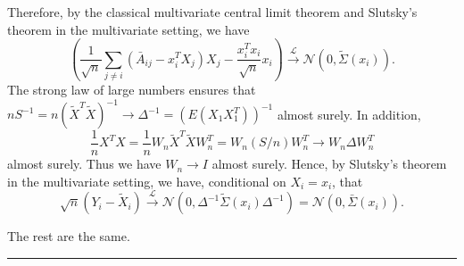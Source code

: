 \documentclass[a4paper]{article}
\newenvironment{proof}{{\bf Proof:  }}{\hfill\rule{2mm}{2mm}}
\begin{document}
\begin{proof}
Therefore, by the classical multivariate central limit theorem and Slutsky's theorem in the multivariate setting, we have
\[
	\left( \frac{1}{\sqrt{n}} \sum_{j \ne i}(\bar{A}_{ij} - x_i^T X_j) X_j - \frac{x_i^T x_i}{\sqrt{n}} x_i \right) \stackrel{\mathcal{L}}{\rightarrow} \mathcal{N}(0, \tilde{\Sigma}(x_i)).
\]
The strong law of large numbers ensures that $n S^{-1} = n (\tilde{X}^T \tilde{X})^{-1} \rightarrow \Delta^{-1} = (E(X_1 X_1^T))^{-1}$ almost surely. In addition,
\[
	\frac{1}{n} X^T X =  \frac{1}{n} W_n \tilde{X}^T \tilde{X} W_n^T = W_n (S/n) W_n^T \rightarrow W_n \Delta W_n^T
\]
almost surely. Thus we have $W_n \rightarrow I$ almost surely. Hence, by Slutsky's theorem in the multivariate setting, we have, conditional on $X_i = x_i$, that
\[
	\sqrt{n}(Y_i - \tilde{X}_i) \stackrel{\mathcal{L}}{\rightarrow} \mathcal{N}(0, \Delta^{-1} \tilde{\Sigma}(x_i) \Delta^{-1}) = \mathcal{N}(0, \bar{\Sigma}(x_i)).
\]

The rest are the same.
\end{proof}
\end{document}
